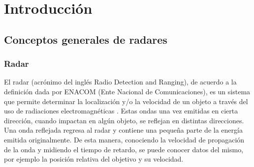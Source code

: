 
\chapter{Introducción} %

\label{Chapter1} %
\label{IntroGeneral}


\newcommand{\keyword}[1]{\textbf{#1}}
\newcommand{\tabhead}[1]{\textbf{#1}}
\newcommand{\code}[1]{\texttt{#1}}
\newcommand{\file}[1]{\texttt{\bfseries#1}}
\newcommand{\option}[1]{\texttt{\itshape#1}}
\newcommand{\grados}{$^{\circ}$}




\section{Conceptos generales de radares}

\subsection{Radar}

El radar (acrónimo del inglés Radio Detection and Ranging), de acuerdo a la definición dada por ENACOM (Ente Nacional de Comunicaciones), es un sistema que permite determinar la localización y/o la velocidad de un objeto a través del uso de radiaciones electromagnéticas \citep{Enacom}. Estas ondas una vez emitidas en cierta dirección, cuando impactan en algún objeto, se reflejan en distintas direcciones. Una onda reflejada regresa al radar y contiene una pequeña parte de la energía emitida originalmente. De esta manera, conociendo la velocidad de propagación de la onda y midiendo el tiempo de retardo, se puede conocer datos del mismo, por ejemplo la posición relativa del objetivo y su velocidad.

